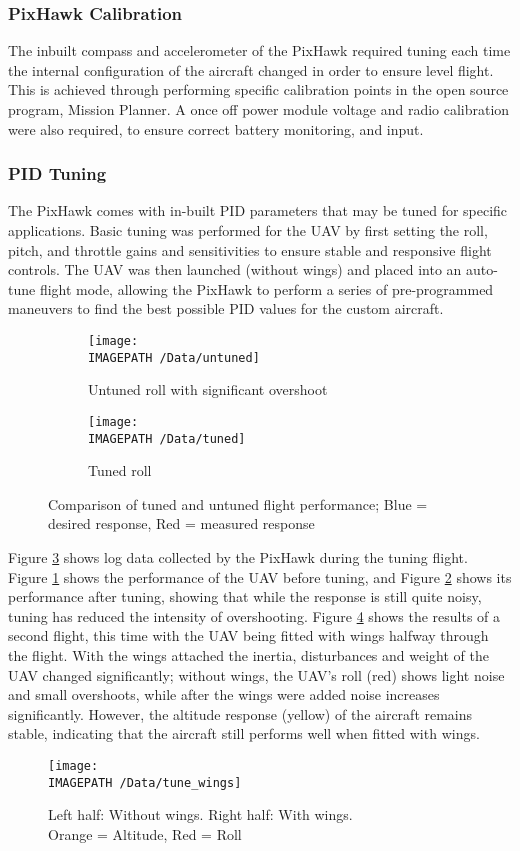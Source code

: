 \subsubsection*{PixHawk Calibration}
The inbuilt compass and accelerometer of the PixHawk required tuning each time the internal configuration of the aircraft changed in order to ensure level flight. This is achieved through performing specific calibration points in the open source program, Mission Planner. A once off power module voltage and radio calibration were also required, to ensure correct battery monitoring, and input. 

\subsubsection*{PID Tuning}
The PixHawk comes with in-built PID parameters that may be tuned for specific applications. Basic tuning was performed for the UAV by first setting the roll, pitch, and throttle gains and sensitivities to ensure stable and responsive flight controls. The UAV was then launched (without wings) and placed into an auto-tune flight mode, allowing the PixHawk to perform a series of pre-programmed maneuvers to find the best possible PID values for the custom aircraft.\\

\begin{figure}[!ht]
	\centering
	\begin{subfigure}{.5\textwidth}
		\texttt{[image: \\IMAGEPATH /Data/untuned]}
		\caption{Untuned roll with significant overshoot}
		\label{fig:untunedroll}
	\end{subfigure}%
	\begin{subfigure}{.5\textwidth}
		\centering
		\texttt{[image: \\IMAGEPATH /Data/tuned]}
		\caption{Tuned roll}
		\label{fig:tunedroll}
	\end{subfigure}
	\caption{Comparison of tuned and untuned flight performance; Blue = desired response, Red = measured response}
	\label{fig:tune1}
\end{figure}

Figure \ref{fig:tune1} shows log data collected by the PixHawk during the tuning flight. Figure \ref{fig:untunedroll} shows the performance of the UAV before tuning, and Figure \ref{fig:tunedroll} shows its performance after tuning, showing that while the response is still quite noisy, tuning has reduced the intensity of overshooting. Figure \ref{fig:tune2} shows the results of a second flight, this time with the UAV being fitted with wings halfway through the flight. With the wings attached the inertia, disturbances and weight of the UAV changed significantly; without wings, the UAV's roll (red) shows light noise and small overshoots, while after the wings were added noise increases significantly. However, the altitude response (yellow) of the aircraft remains stable, indicating that the aircraft still performs well when fitted with wings.

\begin{figure}[!ht]
	\centering
	\texttt{[image: \\IMAGEPATH /Data/tune\_wings]}
	\caption{Left half: Without wings. Right half: With wings.\\ Orange = Altitude, Red = Roll}
	\label{fig:tune2}
\end{figure}